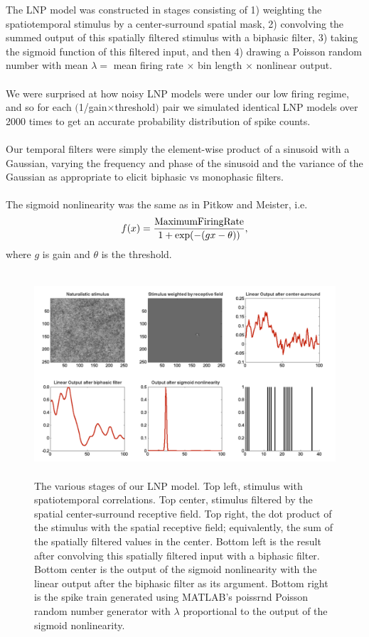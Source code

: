 \documentclass[12pt]{article}
\begin{document}
The LNP model was constructed in stages consisting of 1) weighting the spatiotemporal stimulus by a center-surround spatial mask, 2) convolving the summed output of this spatially filtered stimulus with a biphasic filter, 3) taking the sigmoid function of this filtered input, and then 4) drawing a Poisson random number with mean $\lambda = $ mean firing rate $\times$ bin length $\times$ nonlinear output. \\
\\
We were surprised at how noisy LNP models were under our low firing regime, and so for each $($1/gain$\times$threshold$)$ pair we simulated identical LNP models over 2000 times to get an accurate probability distribution of spike counts. \\
\\
Our temporal filters were simply the element-wise product of a sinusoid with a Gaussian, varying the frequency and phase of the sinusoid and the variance of the Gaussian as appropriate to elicit biphasic vs monophasic filters.  \\
\\
The sigmoid nonlinearity was the same as in Pitkow and Meister, i.e.
\begin{align*}
f(x) = \frac{{\rm Maximum Firing Rate}}{1 + \exp(-(gx - \theta))},
\end{align*}
where $g$ is gain and $\theta$ is the threshold.

\begin{figure}[h!!]
\centerline{\includegraphics*[height = 3.0in,width=5.5in]{lnpMovieEnd.pdf}}
\label{Figure whatever}
\caption{The various stages of our LNP model.  Top left, stimulus with spatiotemporal correlations.  Top center, stimulus filtered by the spatial center-surround receptive field.  Top right, the dot product of the stimulus with the spatial receptive field; equivalently, the sum of the spatially filtered values in the center.  Bottom left is the result after convolving this spatially filtered input with a biphasic filter.  Bottom center is the output of the sigmoid nonlinearity with the linear output after the biphasic filter as its argument.  Bottom right is the spike train generated using MATLAB's poissrnd Poisson random number generator with $\lambda$ proportional to the output of the sigmoid nonlinearity.}
\end{figure}
\end{document}
